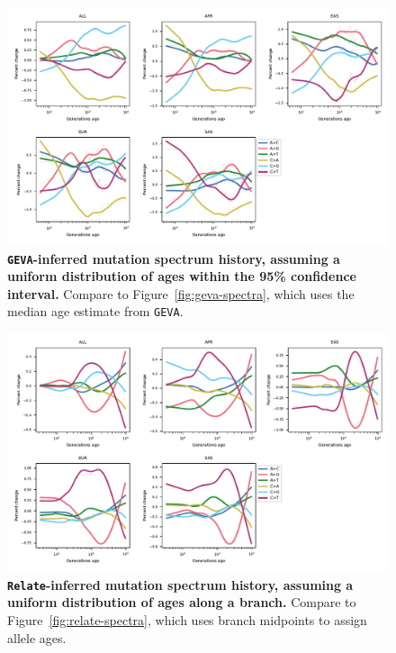 \documentclass[]{article}
\newcommand{\GEVA}{\texttt{GEVA}\xspace}
\newcommand{\relate}{\texttt{Relate}\xspace}
\begin{document}
\begin{figure}[ht!]
    \centering
    \includegraphics[width=\textwidth]{../plots/spectrum_history.geva.max_age.10000.CI.pdf}
    \caption{
        \textbf{\GEVA-inferred mutation spectrum history, assuming a uniform
        distribution of ages within the 95\% confidence interval.} Compare to
        Figure~\ref{fig:geva-spectra}, which uses the median age estimate
        from \GEVA.
    }
    \label{fig:geva-CI}
\end{figure}


\begin{figure}[ht!]
    \centering
    \includegraphics[width=\textwidth]{../plots/spectrum_history.relate.max_age.10000.CI.pdf}
    \caption{
        \textbf{\relate-inferred mutation spectrum history, assuming a uniform
        distribution of ages along a branch.}
        Compare to Figure~\ref{fig:relate-spectra},
        which uses branch midpoints to assign allele ages.
    }
    \label{fig:relate-CI}
\end{figure}
\end{document}
